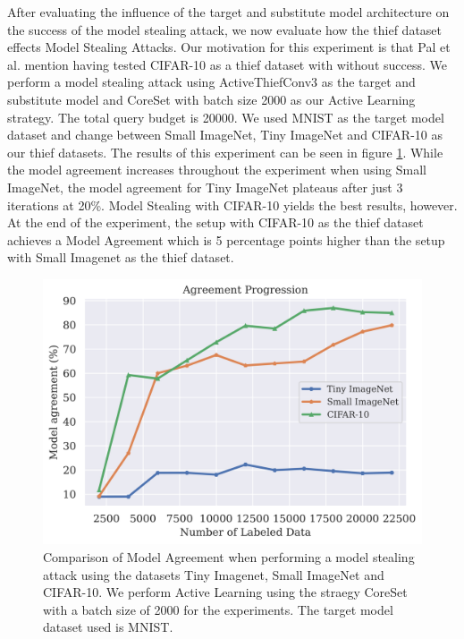 After evaluating the influence of the target and substitute model architecture on the success of the model stealing attack, we now evaluate how the thief dataset effects Model Stealing Attacks. Our motivation for this experiment is that Pal et al. 
mention having tested CIFAR-10 as a thief dataset with without success. We perform a model stealing attack using ActiveThiefConv3 as the target and substitute model and CoreSet with batch size 2000 as our Active Learning strategy. The total query budget
is 20000. We used MNIST as the target model dataset and change between Small ImageNet, Tiny ImageNet and CIFAR-10 as our thief datasets. The results of this experiment can be seen in figure \ref{fig:Evaluation:Results:CAL:EffectDataset}. While the model agreement 
increases throughout the experiment when using Small ImageNet, the model agreement for Tiny ImageNet plateaus after just 3 iterations at 20\%. Model Stealing with CIFAR-10 yields the best results, however. At the end of the experiment, the setup with CIFAR-10 as 
the thief dataset achieves a Model Agreement which is 5 percentage points higher than the setup with Small Imagenet as the thief dataset. \par

\begin{figure}[h]
    \centering
    \includegraphics[width=0.8\linewidth]{images/results_CALMS/effect_dataset.png}
    \caption[Effect of Thief Dataset choice on the success of Model Stealing Attacks]{Comparison of Model Agreement when performing a model stealing attack using the datasets Tiny Imagenet, Small ImageNet and CIFAR-10. We perform Active Learning using the 
    straegy CoreSet with a batch size of 2000 for the experiments. The target model dataset used is MNIST.}
    \label{fig:Evaluation:Results:CAL:EffectDataset}
\end{figure}



